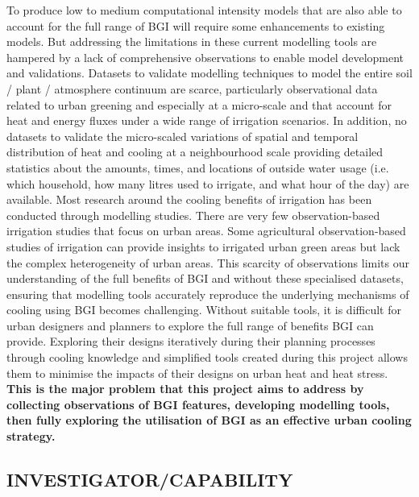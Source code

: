 To produce low to medium computational intensity models that are also able to account for the full range of BGI will require some enhancements to existing models. But addressing the limitations in these current modelling tools are hampered by a lack of comprehensive observations to enable model development and validations. Datasets to validate modelling techniques to model the entire soil / plant / atmosphere continuum are scarce\cite{Pataki2013}, particularly observational data related to urban greening and especially at a micro-scale and that account for heat and energy fluxes under a wide range of irrigation scenarios. In addition, no datasets to validate the micro-scaled variations of spatial and temporal distribution of heat and cooling at a neighbourhood scale providing detailed statistics about the amounts, times, and locations of outside water usage (i.e. which household, how many litres used to irrigate, and what hour of the day) are available. Most research around the cooling benefits of irrigation has been conducted through modelling studies\cite{Kanamaru2008,Yang2015a,Broadbent2018a}. There are very few observation-based irrigation studies that focus on urban areas\cite{Broadbent2017a}. Some agricultural observation-based studies of irrigation\cite{Chen2018b} can provide insights to irrigated urban green areas but lack the complex heterogeneity of urban areas. This scarcity of observations limits our understanding of the full benefits of BGI and without these specialised datasets, ensuring that modelling tools accurately reproduce the underlying mechanisms of cooling using BGI becomes challenging. Without suitable tools, it is difficult for urban designers and planners to explore the full range of benefits BGI can provide. Exploring their designs iteratively during their planning processes through cooling knowledge and simplified tools created during this project allows them to minimise the impacts of their designs on urban heat and heat stress. \textbf{This is the major problem that this project aims to address by collecting observations of BGI features, developing modelling tools, then fully exploring the utilisation of BGI as an effective urban cooling strategy.}

\subsection*{\TitleFont INVESTIGATOR/CAPABILITY}


